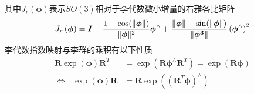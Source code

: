 其中$J_r\left( \boldsymbol{\phi} \right)$表示$SO(3)$相对于李代数微小增量的右雅各比矩阵
\begin{equation}
\label{equ4}
J_r\left( \boldsymbol{\phi} \right) = \boldsymbol{I} - {{1-\cos(\Vert \boldsymbol{\phi} \Vert)} \over \Vert \boldsymbol{\phi} \Vert^2 } \boldsymbol{\phi}^{\wedge}+
{{ \Vert \boldsymbol{\phi} \Vert-\sin(\Vert \boldsymbol{\phi} \Vert)} \over \Vert \boldsymbol{\phi^3} \Vert }\left(\boldsymbol{\phi}^{\wedge}\right)^2
\end{equation}
李代数指数映射与李群的乘积有以下性质
\begin{equation}
\label{equ5}
\begin{aligned}
\boldsymbol{R} \exp \left( \boldsymbol{\phi} \right) \boldsymbol{R}^T &= \exp \left( \boldsymbol{R}  \boldsymbol{\phi}^{\wedge} \boldsymbol{R}^T \right) = \exp \left(  \boldsymbol{R} \boldsymbol{\phi} \right)
\\ 
\Leftrightarrow \ \ \ \exp \left( \boldsymbol{\phi} \right) \boldsymbol{R} &=  \boldsymbol{R} \exp \left(\left( \boldsymbol{R}^T  \boldsymbol{\phi} \right)^\wedge\right)
\end{aligned}
\end{equation}


